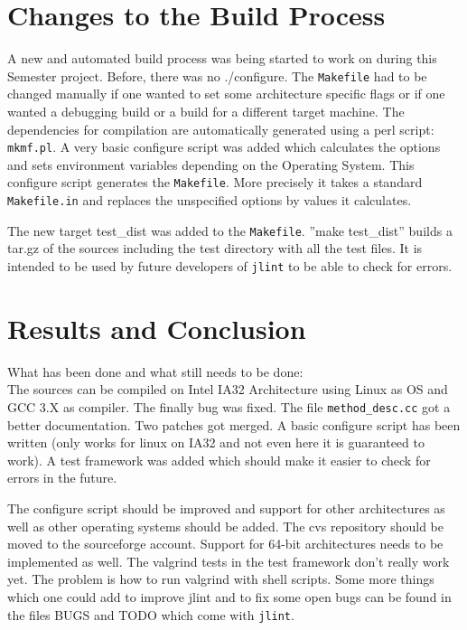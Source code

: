 \documentclass[11pt,twoside,a4paper,draft]{article}
\begin{document}
\section {Changes to the Build Process}

A new and automated build process was being started to work on during this 
Semester project. Before, there was no ./configure. The \texttt{Makefile} had
to be changed
manually if one wanted to set some architecture specific flags or if one wanted
a debugging build or a build for a different target machine. The dependencies 
for compilation are automatically generated using a perl script: 
\texttt{mkmf.pl}. A very basic configure script was added which calculates the
options and sets environment variables depending on the Operating System. This
configure script generates the \texttt{Makefile}. More precisely it takes a 
standard \texttt{Makefile.in} and replaces the unspecified options by values 
it calculates.

The new target test\_dist was added to the \texttt{Makefile}. 
''make test\_dist'' builds a tar.gz of the sources including the test 
directory with all the test files. It is intended to be used by future 
developers of \texttt{jlint} to be able to check for errors.

\section {Results and Conclusion}

What has been done and what still needs to be done:
\\
The sources can be compiled on Intel IA32 Architecture using Linux as OS and
GCC 3.X as compiler. The finally bug was fixed. The file 
\texttt{method\_desc.cc} got a better documentation. Two patches got merged.
A basic configure script has been written (only works for linux on IA32 and 
not even here it is guaranteed to work). A test framework was added which 
should make it easier to check for errors in the future.

The configure script should be improved and support for other architectures as
well as other operating systems should be added. The cvs repository should be
moved to the sourceforge account. Support for 64-bit architectures needs to be
implemented as well. The valgrind tests in the test framework
don't really work yet. The problem is how to run valgrind with shell scripts.
Some more things which one could add to improve jlint and to fix some open bugs
can be found in the files BUGS and TODO which come with \texttt{jlint}.
\end{document}
